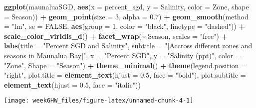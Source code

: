 \documentclass[
]{article}
\newenvironment{Shaded}{\begin{snugshade}}{\end{snugshade}}
\newcommand{\AttributeTok}[1]{\textcolor[rgb]{0.13,0.29,0.53}{#1}}
\newcommand{\ConstantTok}[1]{\textcolor[rgb]{0.56,0.35,0.01}{#1}}
\newcommand{\DecValTok}[1]{\textcolor[rgb]{0.00,0.00,0.81}{#1}}
\newcommand{\FloatTok}[1]{\textcolor[rgb]{0.00,0.00,0.81}{#1}}
\newcommand{\FunctionTok}[1]{\textcolor[rgb]{0.13,0.29,0.53}{\textbf{#1}}}
\newcommand{\NormalTok}[1]{#1}
\newcommand{\SpecialCharTok}[1]{\textcolor[rgb]{0.81,0.36,0.00}{\textbf{#1}}}
\newcommand{\StringTok}[1]{\textcolor[rgb]{0.31,0.60,0.02}{#1}}
\begin{document}
\begin{Shaded}
\begin{Highlighting}[]
\FunctionTok{ggplot}\NormalTok{(maunaluaSGD,}
       \FunctionTok{aes}\NormalTok{(}\AttributeTok{x =}\NormalTok{ percent\_sgd,}
           \AttributeTok{y =}\NormalTok{ Salinity,}
           \AttributeTok{color =}\NormalTok{ Zone,}
           \AttributeTok{shape =}\NormalTok{ Season)) }\SpecialCharTok{+} 
  \FunctionTok{geom\_point}\NormalTok{(}\AttributeTok{size =} \DecValTok{3}\NormalTok{, }\AttributeTok{alpha =} \FloatTok{0.7}\NormalTok{) }\SpecialCharTok{+}
  \FunctionTok{geom\_smooth}\NormalTok{(}\AttributeTok{method =} \StringTok{"lm"}\NormalTok{, }\AttributeTok{se =} \ConstantTok{FALSE}\NormalTok{, }
              \FunctionTok{aes}\NormalTok{(}\AttributeTok{group =} \DecValTok{1}\NormalTok{, }
                  \AttributeTok{color =} \StringTok{"black"}\NormalTok{, }
                  \AttributeTok{linetype =} \StringTok{"dashed"}\NormalTok{)) }\SpecialCharTok{+}
  \FunctionTok{scale\_color\_viridis\_d}\NormalTok{() }\SpecialCharTok{+}
    \FunctionTok{facet\_wrap}\NormalTok{(}\SpecialCharTok{\textasciitilde{}}\NormalTok{ Season, }\AttributeTok{scales =} \StringTok{"free"}\NormalTok{) }\SpecialCharTok{+}
    \FunctionTok{labs}\NormalTok{(}\AttributeTok{title =} \StringTok{"Percent SGD and Salinity"}\NormalTok{,}
         \AttributeTok{subtitle =} \StringTok{"[Accross different zones and seasons in Maunalua Bay]"}\NormalTok{,}
         \AttributeTok{x =} \StringTok{"Percent SGD"}\NormalTok{,}
         \AttributeTok{y =} \StringTok{"Salinity (ppt)"}\NormalTok{,}
         \AttributeTok{color =} \StringTok{"Zone"}\NormalTok{,}
         \AttributeTok{Shape =} \StringTok{"Season"}\NormalTok{) }\SpecialCharTok{+}
    \FunctionTok{theme\_minimal}\NormalTok{() }\SpecialCharTok{+}
    \FunctionTok{theme}\NormalTok{(}\AttributeTok{legend.position =} \StringTok{"right"}\NormalTok{,}
          \AttributeTok{plot.title =} \FunctionTok{element\_text}\NormalTok{(}\AttributeTok{hjust =} \FloatTok{0.5}\NormalTok{, }\AttributeTok{face =} \StringTok{"bold"}\NormalTok{),}
          \AttributeTok{plot.subtitle =} \FunctionTok{element\_text}\NormalTok{(}\AttributeTok{hjust =} \FloatTok{0.5}\NormalTok{, }\AttributeTok{face =} \StringTok{"italic"}\NormalTok{))}
\end{Highlighting}
\end{Shaded}

\begin{center}\texttt{[image: week6HW\_files/figure-latex/unnamed-chunk-4-1]} \end{center}
\end{document}
